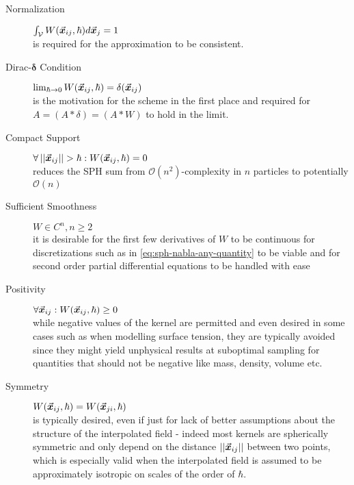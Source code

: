 \begin{description}
  \item[Normalization] $\int_\mathcal{V} W(\vec{\bm{x}}_{ij}, \hbar) d\vec{\bm{x}}_j = 1$\\
        is required for the approximation to be consistent.
  \item[Dirac-$\boldsymbol{\delta}$ Condition] $\lim_{\hbar\rightarrow 0} W(\vec{\bm{x}}_{ij}, \hbar) = \delta(\vec{\bm{x}}_{ij})$ \\
        is the motivation for the scheme in the first place and required for $A=(A * \delta)=(A * W)$ to hold in the limit.
  \item[Compact Support] $\forall \left|\left|\vec{\bm{x}}_{ij}\right|\right| > \hbar: W(\vec{\bm{x}}_{ij}, \hbar) = 0$\\
        reduces the SPH sum from $\mathcal{O}(n^2)$-complexity in $n$ particles to potentially $\mathcal{O}(n)$
  \item[Sufficient Smoothness] $W \in C^n, n\geq 2$\\
        it is desirable for the first few derivatives of $W$ to be continuous for discretizations such as in \autoref{eq:sph-nabla-any-quantity} to be viable and for second order partial differential equations to be handled with ease\autocite*{tutorial}
  \item[Positivity] $\forall \vec{\bm{x}}_{ij}: W(\vec{\bm{x}}_{ij}, \hbar) \geq 0$\\
        while negative values of the kernel are permitted\autocite*{sph-lucy-77} and even desired in some cases such as when modelling surface tension\autocite*{surface-tension-akinci-2013}, they are typically avoided since they might yield unphysical results at suboptimal sampling for quantities that should not be negative like mass, density, volume etc.
  \item[Symmetry] $W(\vec{\bm{x}}_{ij}, \hbar) = W(\vec{\bm{x}}_{ji}, \hbar)$\\
        is typically desired, even if just for lack of better assumptions about the structure of the interpolated field - indeed most kernels are spherically symmetric and only depend on the distance $\left|\left|\vec{\bm{x}}_{ij}\right|\right|$ between two points, which is especially valid when the interpolated field is assumed to be approximately isotropic on scales of the order of $\hbar$.
\end{description}

